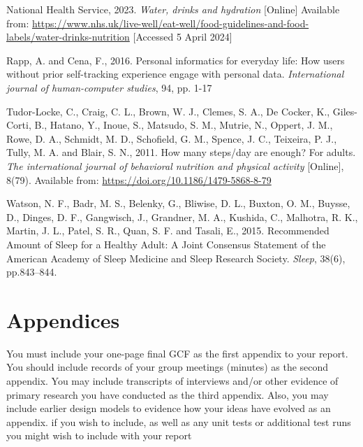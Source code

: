 \documentclass[12pt]{article}
\begin{document}
\begin{thebibliography}{99}
    National Health Service, 2023. \textit{Water, drinks and hydration} [Online] 
    Available from: 
    \url{https://www.nhs.uk/live-well/eat-well/food-guidelines-and-food-labels/water-drinks-nutrition} 
    [Accessed 5 April 2024]
    
    Rapp, A. and Cena, F., 2016. Personal informatics for everyday life: 
    How users without prior self-tracking experience engage with personal data. 
    \textit{International journal of human-computer studies}, 94, pp. 1-17

    Tudor-Locke, C., Craig, C. L., Brown, W. J., Clemes, S. A., De Cocker, K., 
    Giles-Corti, B., Hatano, Y., Inoue, S., Matsudo, S. M., Mutrie, N., Oppert, J. M., Rowe, D. A., 
    Schmidt, M. D., Schofield, G. M., Spence, J. C., Teixeira, P. J., Tully, M. A. and Blair, S. N., 2011. 
    How many steps/day are enough? For adults. 
    \textit{The international journal of behavioral nutrition and physical activity} 
    [Online], 8(79). Available from: \url{https://doi.org/10.1186/1479-5868-8-79}

    Watson, N. F., Badr, M. S., Belenky, G., Bliwise, D. L., Buxton, O. M., Buysse, D., 
    Dinges, D. F., Gangwisch, J., Grandner, M. A., Kushida, C., Malhotra, R. K., Martin, J. L., Patel, S. R., 
    Quan, S. F. and Tasali, E., 2015. 
    Recommended Amount of Sleep for a Healthy Adult: 
    A Joint Consensus Statement of the American Academy of Sleep Medicine and Sleep Research Society. 
    \textit{Sleep}, 38(6), pp.843–844.
\end{thebibliography}


\section{Appendices}
You must include your one-page final GCF as the first appendix to your report. You should
include records of your group meetings (minutes) as the second appendix. You may include
transcripts of interviews and/or other evidence of primary research you have conducted as
the third appendix.
Also, you may include earlier design models to evidence how your ideas have evolved as an
appendix. if you wish to include, as well as any unit tests or additional test runs you might
wish to include with your report
\end{document}
